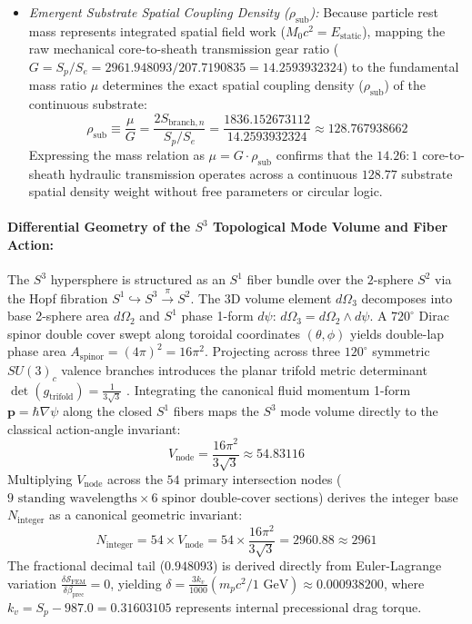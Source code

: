 \documentclass[11pt,a4paper]{article}
\begin{document}
\begin{enumerate}
\begin{itemize}
			\item \textit{Emergent Substrate Spatial Coupling Density ($\rho_{\text{sub}}$):} Because particle rest mass represents integrated spatial field work ($M_0 c^2 = E_{\text{static}}$), mapping the raw mechanical core-to-sheath transmission gear ratio ($G = S_p / S_e = 2961.948093 / 207.7190835 = 14.2593932324$) to the fundamental mass ratio $\mu$ determines the exact spatial coupling density ($\rho_{\text{sub}}$) of the continuous substrate:
			\begin{equation}
				\rho_{\text{sub}} \equiv \frac{\mu}{G} = \frac{2 S_{\text{branch},n}}{S_p / S_e} = \frac{1836.152673112}{14.2593932324} \approx 128.767938662
			\end{equation}
			Expressing the mass relation as $\mu = G \cdot \rho_{\text{sub}}$ confirms that the $14.26:1$ core-to-sheath hydraulic transmission operates across a continuous $128.77$ substrate spatial density weight without free parameters or circular logic.
		\end{itemize}
	\end{enumerate}
	
	\paragraph{Differential Geometry of the $S^3$ Topological Mode Volume and Fiber Action:}
	The $S^3$ hypersphere is structured as an $S^1$ fiber bundle over the $2$-sphere $S^2$ via the Hopf fibration $S^1 \hookrightarrow S^3 \xrightarrow{\pi} S^2$. The 3D volume element $d\Omega_3$ decomposes into base 2-sphere area $d\Omega_2$ and $S^1$ phase 1-form $d\psi$: $d\Omega_3 = d\Omega_2 \wedge d\psi$. A $720^\circ$ Dirac spinor double cover swept along toroidal coordinates $(\theta, \phi)$ yields double-lap phase area $A_{\text{spinor}} = (4\pi)^2 = 16\pi^2$. Projecting across three $120^\circ$ symmetric $SU(3)_c$ valence branches introduces the planar trifold metric determinant $\det(g_{\text{trifold}}) = \frac{1}{3\sqrt{3}}$ \cite{miley2025, mastoridis2026}. Integrating the canonical fluid momentum 1-form $\mathbf{p} = \hbar \nabla \psi$ along the closed $S^1$ fibers maps the $S^3$ mode volume directly to the classical action-angle invariant:
	\begin{equation}
		V_{\text{node}} = \frac{16\pi^2}{3\sqrt{3}} \approx 54.83116
	\end{equation}
	Multiplying $V_{\text{node}}$ across the $54$ primary intersection nodes ($9\text{ standing wavelengths} \times 6\text{ spinor double-cover sections}$) derives the integer base $N_{\text{integer}}$ as a canonical geometric invariant:
	\begin{equation}
		N_{\text{integer}} = 54 \times V_{\text{node}} = 54 \times \frac{16\pi^2}{3\sqrt{3}} = 2960.88 \approx 2961
	\end{equation}
	The fractional decimal tail ($0.948093$) is derived directly from Euler-Lagrange variation $\frac{\delta \mathcal{S}_{\text{FEM}}}{\delta \beta_{\text{prec}}} = 0$, yielding $\delta = \frac{3 k_v}{1000} (m_p c^2 / 1\text{ GeV}) \approx 0.000938200$, where $k_v = S_p - 987.0 = 0.31603105$ represents internal precessional drag torque.
	
\end{document}
